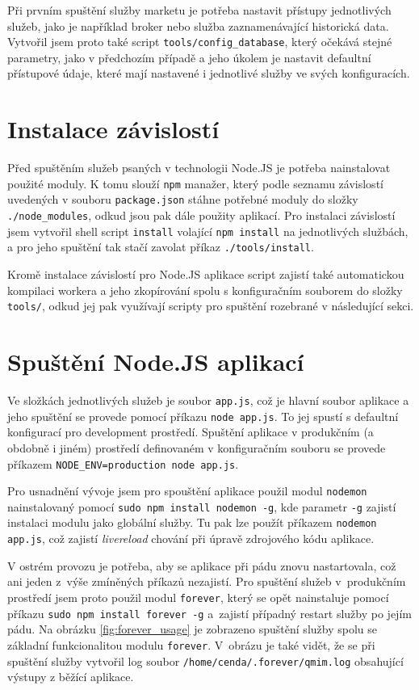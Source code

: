 \documentclass[thesis=M,czech]{FITthesis}[2012/06/26]
\begin{document}
	Při prvním spuštění služby marketu je potřeba nastavit přístupy jednotlivých služeb, jako je například broker nebo služba zaznamenávající historická data. Vytvořil jsem proto také script \texttt{tools/config\_database}, který očekává stejné parametry, jako v předchozím případě a jeho úkolem je nastavit defaultní přístupové údaje, které mají nastavené i jednotlivé služby ve svých konfiguracích.
	
\section{Instalace závislostí}
\label{sec:dependenci}

	Před spuštěním služeb psaných v technologii Node.JS je potřeba nainstalovat použité moduly. K tomu slouží \texttt{npm} manažer, který podle seznamu závislostí uvedených v souboru \texttt{package.json} stáhne potřebné moduly do složky \texttt{./node\_modules}, odkud jsou pak dále použity aplikací. Pro instalaci závislostí jsem vytvořil shell script \texttt{install} volající \texttt{npm install} na jednotlivých službách, a pro jeho spuštění tak stačí zavolat příkaz \texttt{./tools/install}.
	
	Kromě instalace závislostí pro Node.JS aplikace script zajistí také automatickou kompilaci workera a jeho zkopírování spolu s konfiguračním souborem do složky \texttt{tools/}, odkud jej pak využívají scripty pro spuštění rozebrané v následující sekci.

\section{Spuštění Node.JS aplikací}

	Ve složkách jednotlivých služeb je soubor \texttt{app.js}, což je hlavní soubor aplikace a jeho spuštění se provede pomocí příkazu \texttt{node app.js}. To jej spustí s defaultní konfigurací pro development prostředí. Spuštění aplikace v produkčním (a obdobně i jiném) prostředí definovaném v konfiguračním souboru se provede příkazem \texttt{NODE\_ENV=production node app.js}.
	
	Pro usnadnění vývoje jsem pro spouštění aplikace použil modul \texttt{nodemon} nainstalovaný pomocí \texttt{sudo npm install nodemon -g}, kde parametr \texttt{-g} zajistí instalaci modulu jako globální služby. Tu pak lze použít příkazem \texttt{nodemon app.js}, což zajistí \textit{livereload} chování při úpravě zdrojového kódu aplikace.
	
	V ostrém provozu je potřeba, aby se aplikace při pádu znovu nastartovala, což ani jeden z~výše zmíněných příkazů nezajistí. Pro spuštění služeb v~produkčním prostředí jsem proto použil modul \texttt{forever}, který se opět nainstaluje pomocí příkazu \texttt{sudo npm install forever -g} a~zajistí případný restart služby po jejím pádu. Na obrázku \ref{fig:forever_usage} je zobrazeno spuštění služby spolu se základní funkcionalitou modulu \texttt{forever}. V~obrázu je také vidět, že se při spuštění služby vytvořil log soubor \texttt{/home/cenda/.forever/qmim.log} obsahující výstupy z běžící aplikace.
	
\end{document}
